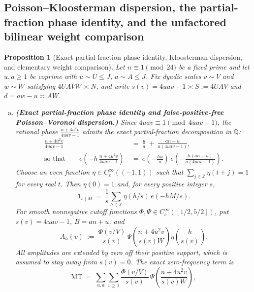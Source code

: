 \documentclass[11pt, a4paper]{article}
\theoremstyle{plain}
\newtheorem{proposition}[theorem]{Proposition}
\theoremstyle{definition}
\newcommand{\Z}{\mathbb{Z}}
\newcommand{\Q}{\mathbb{Q}}
\begin{document}
\subsection{Poisson--Kloosterman dispersion, the partial-fraction phase identity, and the unfactored bilinear weight comparison}\label{subsec:kloosterman_dispersion}

\begin{proposition}[Exact partial-fraction phase identity, Kloosterman dispersion, and elementary weight comparison]\label{prop:kloosterman_dispersion}\label{thm:exact_dispersion_reciprocity_Fn}\label{thm:bezout_transfer_4u2_stationary_phase}
Let $n\equiv1\pmod{24}$ be a fixed prime and let $u,a\ge1$ be coprime with $u\sim U\le J$, $a\sim A\le J$. Fix dyadic scales $v\sim V$ and $w\sim W$ satisfying $4UAVW\asymp N$, and write $s(v)=4uav-1\asymp S:=4UAV$ and $d=aw-u\asymp AW$.
\begin{enumerate}[(a)]
    \item \textbf{(Exact partial-fraction phase identity and false-positive-free Poisson--Voronoi dispersion.)} Since $4uav\equiv1\pmod{4uav-1}$, the rational phase $\frac{n+4u^{2}v}{4uav-1}$ admits the exact partial-fraction decomposition in $\Q$:
    \begin{equation}\label{eq:exact_partial_fraction_phase}
    \begin{split}
    \frac{n+4u^{2}v}{4uav-1}\ &=\ \frac{u}{a}\ +\ \frac{an+u}{a(4uav-1)},\\
    \text{so that}\qquad e\!\left(-h\,\frac{n+4u^{2}v}{4uav-1}\right)\ &=\ e\!\left(-\frac{hu}{a}\right)\,e\!\left(-\frac{h(an+u)}{a(4uav-1)}\right).
    \end{split}
    \end{equation}
    Choose an even function $\eta\in C_c^{\infty}((-1,1))$ such that $\sum_{j\in\Z}\eta(t+j)=1$ for every real $t$. Then $\eta(0)=1$ and, for every positive integer $s$,
    \[
    \mathbf{1}_{s\mid M}\ =\ \frac{1}{s}\sum_{h\in\Z}\eta(h/s)\,e(-hM/s).
    \]
    For smooth nonnegative cutoff functions $\Phi,\Psi\in C_c^{\infty}([1/2,5/2])$, put $s(v)=4uav-1$, $B=an+u$, and
    \begin{equation}\label{eq:poisson_kloosterman}
    A_h(v)\ :=\ \frac{\Phi(v/V)}{s(v)}\,\Psi\!\left(\frac{n+4u^{2}v}{s(v)W}\right)\eta\!\left(\frac{h}{s(v)}\right).
    \end{equation}
    All amplitudes are extended by zero off their positive support, which is assumed to stay away from $s(v)=0$. The exact zero-frequency term is
    \[
    \mathrm{MT}\ =\ \sum_{u,a}\sum_{v\ge1}\frac{\Phi(v/V)}{s(v)}\,\Psi\!\left(\frac{n+4u^{2}v}{s(v)W}\right),
\]
\end{enumerate}
\end{proposition}
\end{document}
